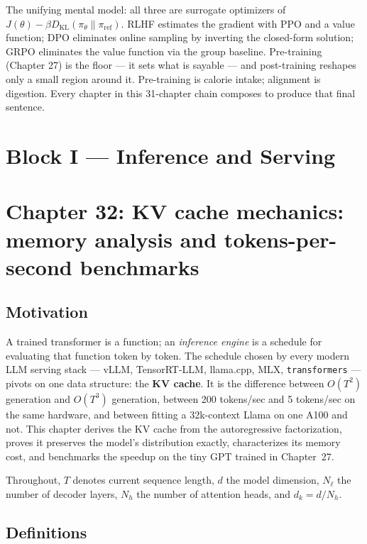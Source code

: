 \documentclass[11pt]{article}
\theoremstyle{remark}
\begin{document}
The unifying mental model: all three are surrogate optimizers of $J(\theta)-\beta D_{\mathrm{KL}}(\pi_\theta\|\pi_{\mathrm{ref}})$. RLHF estimates the gradient with PPO and a value function; DPO eliminates online sampling by inverting the closed-form solution; GRPO eliminates the value function via the group baseline. Pre-training (Chapter 27) is the floor — it sets what is sayable — and post-training reshapes only a small region around it. Pre-training is calorie intake; alignment is digestion. Every chapter in this 31-chapter chain composes to produce that final sentence.


\section*{Block I --- Inference and Serving}

\section*{Chapter 32: KV cache mechanics: memory analysis and tokens-per-second benchmarks}

\subsection*{Motivation}

A trained transformer is a function; an \emph{inference engine} is a schedule for evaluating that function token by token. The schedule chosen by every modern LLM serving stack --- vLLM, TensorRT-LLM, llama.cpp, MLX, \texttt{transformers} --- pivots on one data structure: the \textbf{KV cache}. It is the difference between $O(T^2)$ generation and $O(T^3)$ generation, between 200 tokens/sec and 5 tokens/sec on the same hardware, and between fitting a 32k-context Llama on one A100 and not. This chapter derives the KV cache from the autoregressive factorization, proves it preserves the model's distribution exactly, characterizes its memory cost, and benchmarks the speedup on the tiny GPT trained in Chapter~27.

Throughout, $T$ denotes current sequence length, $d$ the model dimension, $N_\ell$ the number of decoder layers, $N_h$ the number of attention heads, and $d_k = d / N_h$.

\subsection*{Definitions}
\end{document}
